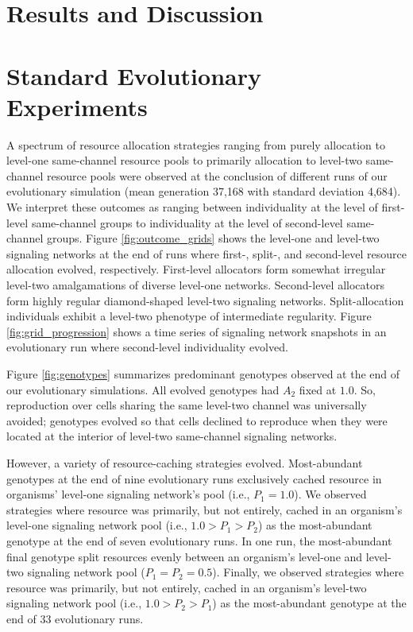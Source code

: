 \section{Results and Discussion}

\section{Standard Evolutionary Experiments}







A spectrum of resource allocation strategies ranging from purely allocation to level-one same-channel resource pools to primarily allocation to level-two same-channel resource pools were observed at the conclusion of different runs of our evolutionary simulation (mean generation 37,168 with standard deviation 4,684).
We interpret these outcomes as ranging between individuality at the level of first-level same-channel groups to individuality at the level of second-level same-channel groups.
Figure \ref{fig:outcome_grids} shows the level-one and level-two signaling networks at the end of runs where first-, split-, and second-level resource allocation evolved, respectively.
First-level allocators form somewhat irregular level-two amalgamations of diverse level-one networks.
Second-level allocators form highly regular diamond-shaped level-two signaling networks.
Split-allocation individuals exhibit a level-two phenotype of intermediate regularity.
Figure \ref{fig:grid_progression} shows a time series of signaling network snapshots in an evolutionary run where second-level individuality evolved.

Figure \ref{fig:genotypes} summarizes predominant genotypes observed at the end of our evolutionary simulations.
All evolved genotypes had $A_2$ fixed at $1.0$.
So, reproduction over cells sharing the same level-two channel was universally avoided;
genotypes evolved so that cells declined to reproduce when they were located at the interior of level-two same-channel signaling networks.

However, a variety of resource-caching strategies evolved.
Most-abundant genotypes at the end of nine evolutionary runs exclusively cached resource in organisms' level-one signaling network's pool (i.e., $P_1 = 1.0$).
We observed strategies where resource was primarily, but not entirely, cached in an organism's level-one signaling network pool (i.e., $1.0 > P_1 > P_2$) as the most-abundant genotype at the end of seven evolutionary runs.
In one run, the most-abundant final genotype split resources evenly between an organism's level-one and level-two signaling network pool ($P_1 = P_2 = 0.5$).
Finally, we observed strategies where resource was primarily, but not entirely, cached in an organism's level-two signaling network pool (i.e., $1.0 > P_2 > P_1$) as the most-abundant genotype at the end of 33 evolutionary runs.

